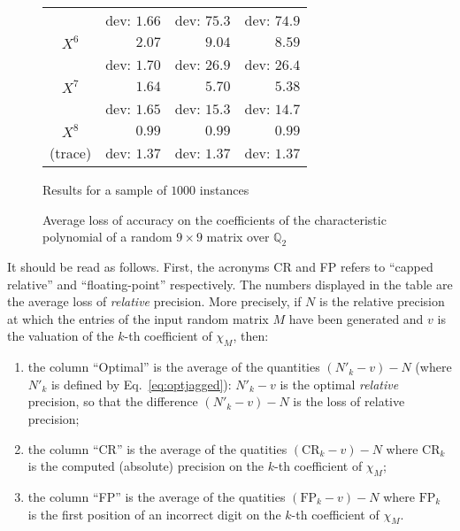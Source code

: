 \documentclass{sig-alternate-05-2015}
\newcommand{\Q}{\mathbb Q}
\begin{document}
\begin{figure}
{\begin{tabular}{|c|r|r|r|}
& {\scriptsize dev: $1.66$} & {\scriptsize dev: $75.3$} & {\scriptsize dev: $74.9$} \\
\rule{0pt}{2.7ex}%
$X^6$ & $2.07$ &   $9.04$           &   $8.59$ \vspace{-1.5ex} \\
& {\scriptsize dev: $1.70$} & {\scriptsize dev: $26.9$} & {\scriptsize dev: $26.4$} \\
\rule{0pt}{2.7ex}%
$X^7$ & $1.64$ &   $5.70$           &   $5.38$ \vspace{-1.5ex} \\
& {\scriptsize dev: $1.65$} & {\scriptsize dev: $15.3$} & {\scriptsize dev: $14.7$} \\
\rule{0pt}{2.7ex}%
$X^8$ & $0.99$ &   $0.99$           &   $0.99$ \vspace{-1.5ex} \\
{\scriptsize (trace)} 
& {\scriptsize dev: $1.37$} & {\scriptsize dev: $1.37$} & {\scriptsize dev: $1.37$} \\
\hline
\end{tabular}}
\hfill\null

\medskip

\hfill
{\footnotesize Results for a sample of $1000$ instances}
\hfill\null

\caption{Average loss of accuracy on the coefficients
of the characteristic polynomial of a random $9 \times 9$
matrix over $\Q_2$}
\label{fig:exp}

\end{figure}
%
It should be read as follows. First, the acronyms CR and FP 
refers to ``capped relative'' and ``floating-point'' respectively.
The numbers displayed in the table are the average loss of
\emph{relative} precision. 
More precisely, if $N$ is the relative precision at
which the entries of the input random matrix $M$ have been generated
and $v$ is the valuation of the $k$-th coefficient of $\chi_M$, then:

\vspace{-2mm}

\begin{enumerate}[$\bullet$]
\renewcommand{\itemsep}{0pt}
\item the column ``Optimal'' is the average of the quantities 
$(N'_k{-}v) - N$ (where $N'_k$ is defined by Eq.~\eqref{eq:optjagged}): 
$N'_k{-}v$ is the optimal \emph{relative} precision, so that the
difference $(N'_k{-}v) - N$ is the loss of relative precision;
\item the column ``CR'' is the average of the quatities 
$(\text{CR}_k{-}v) - N$ where $\text{CR}_k$ is the computed (absolute) 
precision on the $k$-th coefficient of $\chi_M$;
\item the column ``FP'' is the average of the quatities 
$(\text{FP}_k{-}v) - N$ where $\text{FP}_k$ is the first position of
an incorrect digit on the $k$-th coefficient of $\chi_M$.
\end{enumerate}
\end{document}

